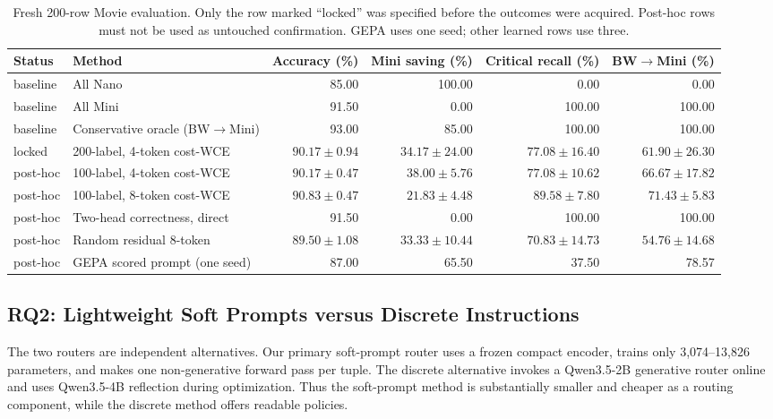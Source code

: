 \begin{table}[t]
  \centering
  \small
  \caption{Fresh 200-row Movie evaluation. Only the row marked ``locked'' was
  specified before the outcomes were acquired. Post-hoc rows must not be used
  as untouched confirmation. GEPA uses one seed; other learned rows use three.}
  \label{tab:fresh}
  \begin{tabular}{llrrrr}
    \toprule
    Status & Method & Accuracy (\%) & Mini saving (\%) & Critical recall (\%) & BW$\rightarrow$Mini (\%)\\
    \midrule
    baseline & All Nano & 85.00 & 100.00 & 0.00 & 0.00\\
    baseline & All Mini & 91.50 & 0.00 & 100.00 & 100.00\\
    baseline & Conservative oracle (BW$\rightarrow$Mini) & 93.00 & 85.00 & 100.00 & 100.00\\
    \midrule
    locked & 200-label, 4-token cost-WCE & $90.17\pm0.94$ & $34.17\pm24.00$ & $77.08\pm16.40$ & $61.90\pm26.30$\\
    post-hoc & 100-label, 4-token cost-WCE & $90.17\pm0.47$ & $38.00\pm5.76$ & $77.08\pm10.62$ & $66.67\pm17.82$\\
    post-hoc & 100-label, 8-token cost-WCE & $90.83\pm0.47$ & $21.83\pm4.48$ & $89.58\pm7.80$ & $71.43\pm5.83$\\
    post-hoc & Two-head correctness, direct & 91.50 & 0.00 & 100.00 & 100.00\\
    post-hoc & Random residual 8-token & $89.50\pm1.08$ & $33.33\pm10.44$ & $70.83\pm14.73$ & $54.76\pm14.68$\\
    post-hoc & GEPA scored prompt (one seed) & 87.00 & 65.50 & 37.50 & 78.57\\
    \bottomrule
  \end{tabular}
\end{table}

\subsection{RQ2: Lightweight Soft Prompts versus Discrete Instructions}

The two routers are independent alternatives. Our primary soft-prompt router
uses a frozen compact encoder, trains only 3,074--13,826 parameters, and makes
one non-generative forward pass per tuple. The discrete alternative invokes a
Qwen3.5-2B generative router online and uses Qwen3.5-4B reflection during
optimization. Thus the soft-prompt method is substantially smaller and cheaper
as a routing component, while the discrete method offers readable policies.

